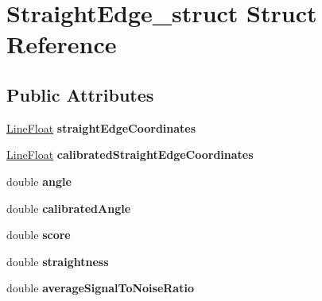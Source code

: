 \hypertarget{structStraightEdge__struct}{\section{\-Straight\-Edge\-\_\-struct \-Struct \-Reference}
\label{structStraightEdge__struct}
}
\subsection*{\-Public \-Attributes}
\begin{DoxyCompactItemize}
\item 
\hypertarget{structStraightEdge__struct_a4dc05233cf74e8dc295984104f19ad97}{\hyperlink{structLineFloat__struct}{\-Line\-Float} {\bfseries straight\-Edge\-Coordinates}}\label{structStraightEdge__struct_a4dc05233cf74e8dc295984104f19ad97}

\item 
\hypertarget{structStraightEdge__struct_a60df12e99ded8eb4c5aa47d276b2fe7c}{\hyperlink{structLineFloat__struct}{\-Line\-Float} {\bfseries calibrated\-Straight\-Edge\-Coordinates}}\label{structStraightEdge__struct_a60df12e99ded8eb4c5aa47d276b2fe7c}

\item 
\hypertarget{structStraightEdge__struct_a09fd612aaa5113e11d0619226ed4cfa6}{double {\bfseries angle}}\label{structStraightEdge__struct_a09fd612aaa5113e11d0619226ed4cfa6}

\item 
\hypertarget{structStraightEdge__struct_ac15d9ea212a7cf287e54ef37b349c057}{double {\bfseries calibrated\-Angle}}\label{structStraightEdge__struct_ac15d9ea212a7cf287e54ef37b349c057}

\item 
\hypertarget{structStraightEdge__struct_ad36a2846715e8dab2e78e2bcb1001699}{double {\bfseries score}}\label{structStraightEdge__struct_ad36a2846715e8dab2e78e2bcb1001699}

\item 
\hypertarget{structStraightEdge__struct_af0d949240e263b6239efaf21c243648e}{double {\bfseries straightness}}\label{structStraightEdge__struct_af0d949240e263b6239efaf21c243648e}

\item 
\hypertarget{structStraightEdge__struct_a2d5559181843e79b9e82a598114f8e4d}{double {\bfseries average\-Signal\-To\-Noise\-Ratio}}\label{structStraightEdge__struct_a2d5559181843e79b9e82a598114f8e4d}


\end{DoxyCompactItemize}
